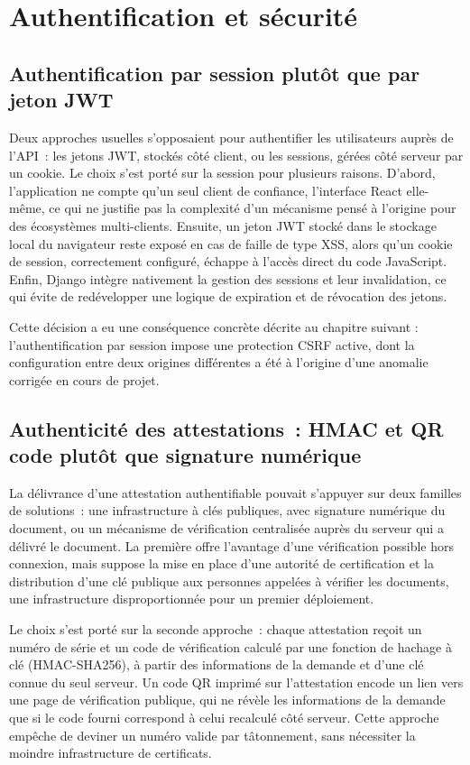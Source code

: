 \section{Authentification et sécurité}

\subsection{Authentification par session plutôt que par jeton JWT}

Deux approches usuelles s'opposaient pour authentifier les utilisateurs auprès de l'API~: les jetons JWT, stockés côté client, ou les sessions, gérées côté serveur par un cookie. Le choix s'est porté sur la session pour plusieurs raisons. D'abord, l'application ne compte qu'un seul client de confiance, l'interface React elle-même, ce qui ne justifie pas la complexité d'un mécanisme pensé à l'origine pour des écosystèmes multi-clients. Ensuite, un jeton JWT stocké dans le stockage local du navigateur reste exposé en cas de faille de type XSS, alors qu'un cookie de session, correctement configuré, échappe à l'accès direct du code JavaScript. Enfin, Django intègre nativement la gestion des sessions et leur invalidation, ce qui évite de redévelopper une logique de expiration et de révocation des jetons.

Cette décision a eu une conséquence concrète décrite au chapitre suivant : l'authentification par session impose une protection CSRF active, dont la configuration entre deux origines différentes a été à l'origine d'une anomalie corrigée en cours de projet.

\subsection{Authenticité des attestations~: HMAC et QR code plutôt que signature numérique}

La délivrance d'une attestation authentifiable pouvait s'appuyer sur deux familles de solutions~: une infrastructure à clés publiques, avec signature numérique du document, ou un mécanisme de vérification centralisée auprès du serveur qui a délivré le document. La première offre l'avantage d'une vérification possible hors connexion, mais suppose la mise en place d'une autorité de certification et la distribution d'une clé publique aux personnes appelées à vérifier les documents, une infrastructure disproportionnée pour un premier déploiement.

Le choix s'est porté sur la seconde approche~: chaque attestation reçoit un numéro de série et un code de vérification calculé par une fonction de hachage à clé (HMAC-SHA256), à partir des informations de la demande et d'une clé connue du seul serveur. Un code QR imprimé sur l'attestation encode un lien vers une page de vérification publique, qui ne révèle les informations de la demande que si le code fourni correspond à celui recalculé côté serveur. Cette approche empêche de deviner un numéro valide par tâtonnement, sans nécessiter la moindre infrastructure de certificats.

